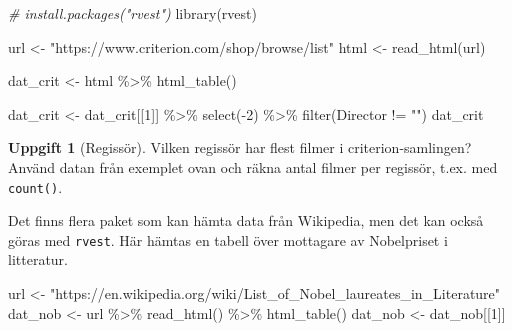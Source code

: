 \documentclass[
]{book}
\newenvironment{Shaded}{\begin{snugshade}}{\end{snugshade}}
\newcommand{\CommentTok}[1]{\textcolor[rgb]{0.56,0.35,0.01}{\textit{#1}}}
\newcommand{\DecValTok}[1]{\textcolor[rgb]{0.00,0.00,0.81}{#1}}
\newcommand{\FunctionTok}[1]{\textcolor[rgb]{0.00,0.00,0.00}{#1}}
\newcommand{\NormalTok}[1]{#1}
\newcommand{\OtherTok}[1]{\textcolor[rgb]{0.56,0.35,0.01}{#1}}
\newcommand{\SpecialCharTok}[1]{\textcolor[rgb]{0.00,0.00,0.00}{#1}}
\newcommand{\StringTok}[1]{\textcolor[rgb]{0.31,0.60,0.02}{#1}}
\theoremstyle{definition}
\theoremstyle{definition}
\theoremstyle{definition}
\newtheorem{exercise}{Uppgift}[chapter]
\theoremstyle{definition}
\theoremstyle{remark}
\begin{document}
\begin{Shaded}
\begin{Highlighting}[]
\CommentTok{\# install.packages("rvest")}
\FunctionTok{library}\NormalTok{(rvest)}

\NormalTok{url }\OtherTok{\textless{}{-}} \StringTok{"https://www.criterion.com/shop/browse/list"}
\NormalTok{html }\OtherTok{\textless{}{-}} \FunctionTok{read\_html}\NormalTok{(url)}

\NormalTok{dat\_crit }\OtherTok{\textless{}{-}}\NormalTok{ html }\SpecialCharTok{\%\textgreater{}\%} 
  \FunctionTok{html\_table}\NormalTok{()}

\NormalTok{dat\_crit }\OtherTok{\textless{}{-}}\NormalTok{ dat\_crit[[}\DecValTok{1}\NormalTok{]] }\SpecialCharTok{\%\textgreater{}\%} 
  \FunctionTok{select}\NormalTok{(}\SpecialCharTok{{-}}\DecValTok{2}\NormalTok{) }\SpecialCharTok{\%\textgreater{}\%} 
  \FunctionTok{filter}\NormalTok{(Director }\SpecialCharTok{!=} \StringTok{""}\NormalTok{)}
\NormalTok{dat\_crit}
\end{Highlighting}
\end{Shaded}

\begin{exercise}[Regissör]
Vilken regissör har flest filmer i criterion-samlingen? Använd datan från exemplet ovan och räkna antal filmer per regissör, t.ex. med \texttt{count()}.
\end{exercise}

Det finns flera paket som kan hämta data från Wikipedia, men det kan också göras med \texttt{rvest}. Här hämtas en tabell över mottagare av Nobelpriset i litteratur.

\begin{Shaded}
\begin{Highlighting}[]
\NormalTok{url }\OtherTok{\textless{}{-}} \StringTok{"https://en.wikipedia.org/wiki/List\_of\_Nobel\_laureates\_in\_Literature"}
\NormalTok{dat\_nob }\OtherTok{\textless{}{-}}\NormalTok{ url }\SpecialCharTok{\%\textgreater{}\%} 
  \FunctionTok{read\_html}\NormalTok{() }\SpecialCharTok{\%\textgreater{}\%} 
  \FunctionTok{html\_table}\NormalTok{()}
\NormalTok{dat\_nob }\OtherTok{\textless{}{-}}\NormalTok{ dat\_nob[[}\DecValTok{1}\NormalTok{]]}
\end{Highlighting}
\end{Shaded}
\end{document}
